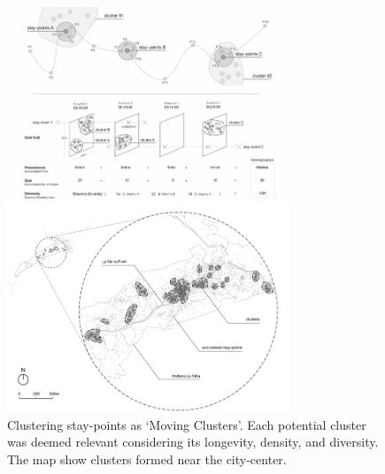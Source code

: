 {    \begin{figure}[!h]
        \begin{center}
            \includegraphics[width=0.75\textwidth]{chapters/insight/revurb/figures/revurb_clusters.png}
        \end{center}
        \caption{Clustering stay-points as `Moving Clusters'. Each potential cluster was deemed relevant considering its longevity, density, and diversity. The map show clusters formed near the city-center.}
        \label{fig:revurb_clusters}
    \end{figure}

}
